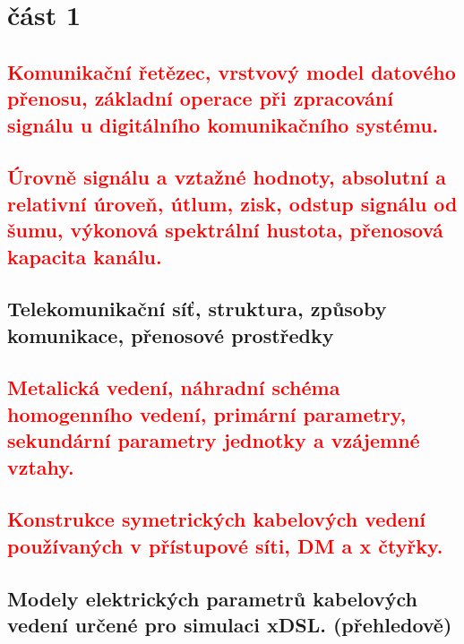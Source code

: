 \section{část 1}
\subsection{\textcolor{red}{Komunikační řetězec, vrstvový model datového přenosu, základní operace při zpracování signálu u digitálního komunikačního systému.}}
\subsection{\textcolor{red}{Úrovně signálu a vztažné hodnoty, absolutní a relativní úroveň, útlum, zisk, odstup signálu od šumu, výkonová spektrální hustota, přenosová kapacita kanálu.}}
\subsection{Telekomunikační síť, struktura, způsoby komunikace, přenosové prostředky}
\subsection{\textcolor{red}{Metalická vedení, náhradní schéma homogenního vedení, primární parametry, sekundární parametry jednotky a vzájemné vztahy.}}
\subsection{\textcolor{red}{Konstrukce symetrických kabelových vedení používaných v přístupové síti, DM a x čtyřky.}}
\subsection{Modely elektrických parametrů kabelových vedení určené pro simulaci xDSL. (přehledově)}